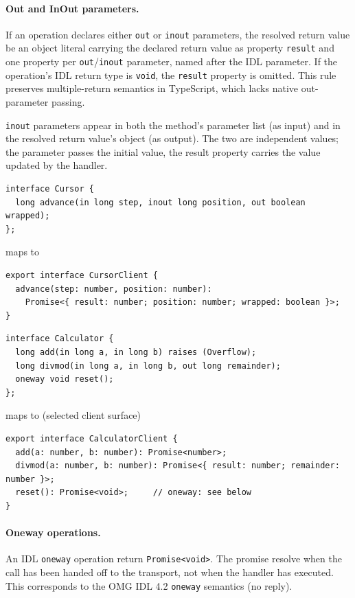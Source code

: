 \documentclass{../styles/zerodds-vendor-spec}
\begin{document}
\paragraph{Out and InOut parameters.} If an operation declares
either \texttt{out} or \texttt{inout} parameters, the resolved
return value  be an object literal carrying the
declared return value as property \texttt{result} and one
property per \texttt{out}/\texttt{inout} parameter, named after
the IDL parameter. If the operation's IDL return type is
\texttt{void}, the \texttt{result} property is omitted. This rule
preserves multiple-return semantics in TypeScript, which lacks
native out-parameter passing.

\texttt{inout} parameters  appear in both the
method's parameter list (as input) and in the resolved return
value's object (as output). The two are independent values; the
parameter passes the initial value, the result property carries
the value updated by the handler.

\begin{specexample}
\begin{lstlisting}
interface Cursor {
  long advance(in long step, inout long position, out boolean wrapped);
};
\end{lstlisting}
maps to
\begin{lstlisting}
export interface CursorClient {
  advance(step: number, position: number):
    Promise<{ result: number; position: number; wrapped: boolean }>;
}
\end{lstlisting}
\end{specexample}

\begin{specexample}
\begin{lstlisting}
interface Calculator {
  long add(in long a, in long b) raises (Overflow);
  long divmod(in long a, in long b, out long remainder);
  oneway void reset();
};
\end{lstlisting}
maps to (selected client surface)
\begin{lstlisting}
export interface CalculatorClient {
  add(a: number, b: number): Promise<number>;
  divmod(a: number, b: number): Promise<{ result: number; remainder: number }>;
  reset(): Promise<void>;     // oneway: see below
}
\end{lstlisting}
\end{specexample}

\paragraph{Oneway operations.} An IDL \texttt{oneway} operation
 return \texttt{Promise<void>}. The promise
 resolve when the call has been handed off to the
transport, not when the handler has executed. This corresponds to
the OMG IDL 4.2 \texttt{oneway} semantics (no reply).
\end{document}
